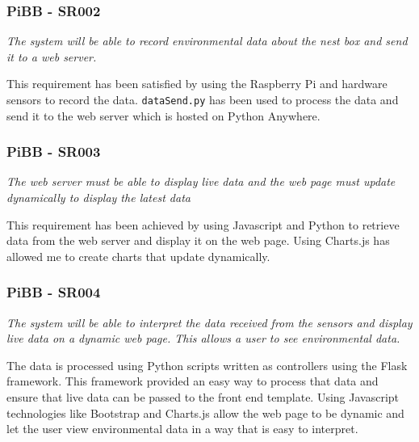 \documentclass[10pt,a4paper]{article}
\begin{document}
\subsubsection{PiBB - SR002}
\begin{center}
\textit{The system will be able to record environmental data about the nest box and send it to a web server.}
\linebreak
\end{center}
This requirement has been satisfied by using the Raspberry Pi and hardware sensors to record the data. \texttt{dataSend.py} has been used to process the data and send it to the web server which is hosted on Python Anywhere. 

\subsubsection{PiBB - SR003}
\begin{center}
\textit{The web server must be able to display live data and the web page must update dynamically to display the latest data}
\linebreak
\end{center}
This requirement has been achieved by using Javascript and Python to retrieve data from the web server and display it on the web page. Using Charts.js has allowed me to create charts that update dynamically.

\subsubsection{PiBB - SR004}
\begin{center}
\textit{The system will be able to interpret the data received from the sensors and display live data on a dynamic web page. This allows a user to see environmental data.}
\linebreak
\end{center}
The data is processed using Python scripts written as controllers using the Flask framework. This framework provided an easy way to process that data and ensure that live data can be passed to the front end template. Using Javascript technologies like Bootstrap and Charts.js allow the web page to be dynamic and let the user view environmental data in a way that is easy to interpret. 
\end{document}
